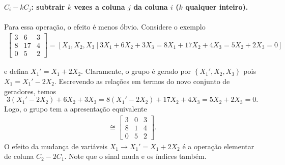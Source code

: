     	\paragraph{$C_i - kC_j$: subtrair $k$ vezes a coluna $j$ da coluna $i$ ($k$ qualquer inteiro).} 
    	Para essa operação, o efeito é menos óbvio. Considere o exemplo
    	\begin{align*}
        	\begin{bmatrix}
        	3 & 6 & 3 \\
        	8 & 17 & 4 \\
        	0 & 5 & 2
        	\end{bmatrix} 
        	= [X_1, X_2, X_3 \ \vert \ 3X_1 + 6X_2 + 3X_3 = 8X_1 + 17X_2 + 4X_3 = 5X_2 + 2X_3 = 0] 
    	\end{align*}
    	\par\vspace{0.3cm} e defina $X_1' = X_1+2X_2$. Claramente, o grupo é gerado por 
    	$\left\{ X_1', X_2, X_3 \right\}$ pois $X_1 = X_1' - 2X_2$. Escrevendo as relações em termos 
    	do novo conjunto de geradores, temos
    	\begin{equation*}
    	    3(X_1' - 2X_2) + 6X_2  + 3X_3 = 8(X_1' - 2X_2) + 17X_2 + 4X_3 = 5X_2 + 2X_3 = 0.
    	\end{equation*} 
    	Logo, o grupo tem a apresentação equivalente
    	\begin{align*}
        	[X_1', X_2, X_3 \ \vert \ 3X_1' + 3X_3 = 8X_1' + X_2 + 4X_3 = 5X_2 + 2X_3 = 0] \cong 
        	\begin{bmatrix}
        	3 & 0 & 3 \\
        	8 & 1 & 4  \\
        	0 & 5 & 2
        	\end{bmatrix}.
    	\end{align*}
    	O efeito da mudança de variáveis $X_1\to X_1' = X_1 + 2X_2$ é a operação 
    	elementar de coluna $C_2 - 2C_1$. Note que o sinal muda e os índices também.
    	
